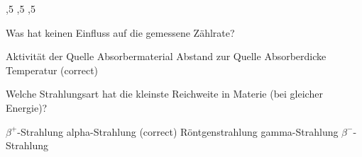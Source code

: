 \documentclass[11pt]{exam}
\begin{document}
\begin{questions}
\begin{choices}
	,5 %
	,5 %
	,5 %
\end{choices}

\vspace{3mm}\question Was hat keinen Einfluss auf die gemessene Zählrate?

\begin{choices}
	\choice Aktivität der Quelle
	\choice Absorbermaterial
	\choice Abstand zur Quelle
	\choice Absorberdicke
	\choice Temperatur (correct)
\end{choices}

\vspace{3mm}\question Welche Strahlungsart hat die kleinste Reichweite in Materie (bei gleicher Energie)?

\begin{choices}
	\choice \( \beta^+ \)-Strahlung
	\choice alpha-Strahlung (correct)
	\choice Röntgenstrahlung
	\choice gamma-Strahlung
	\choice \( \beta^- \)-Strahlung
\end{choices}

\vspace{3mm}\end{questions}
\end{document}
